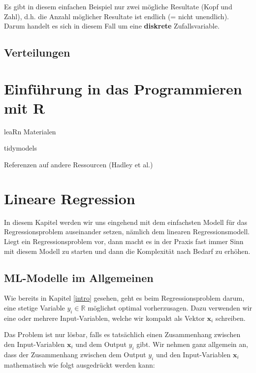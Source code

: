 \documentclass[
]{book}
\begin{document}
Es gibt in diesem einfachen Beispiel nur zwei mögliche Resultate (Kopf und Zahl), d.h. die Anzahl möglicher Resultate ist endlich (= nicht unendlich). Darum handelt es sich in diesem Fall um eine \textbf{diskrete} Zufallsvariable.

\hypertarget{verteilungen}{%
\section{Verteilungen}\label{verteilungen}}

\hypertarget{intro-R}{%
\chapter{Einführung in das Programmieren mit R}\label{intro-R}}

leaRn Materialen

tidymodels

Referenzen auf andere Ressourcen (Hadley et al.)

\hypertarget{lin-reg}{%
\chapter{Lineare Regression}\label{lin-reg}}

In diesem Kapitel werden wir uns eingehend mit dem einfachsten Modell für das Regressionsproblem auseinander setzen, nämlich dem linearen Regressionsmodell. Liegt ein Regressionsproblem vor, dann macht es in der Praxis fast immer Sinn mit diesem Modell zu starten und dann die Komplexität nach Bedarf zu erhöhen.

\hypertarget{ml-modelle-im-allgemeinen}{%
\section{ML-Modelle im Allgemeinen}\label{ml-modelle-im-allgemeinen}}

Wie bereits in Kapitel \ref{intro} gesehen, geht es beim Regressionsproblem darum, eine stetige Variable \(y_i \in \mathbb{R}\) möglichst optimal vorherzusagen. Dazu verwenden wir eine oder mehrere Input-Variablen, welche wir kompakt als Vektor \(\mathbf{x}_i\) schreiben.

Das Problem ist nur lösbar, falls es tatsächlich einen Zusammenhang zwischen den Input-Variablen \(\mathbf{x}_i\) und dem Output \(y_i\) gibt. Wir nehmen ganz allgemein an, dass der Zusammenhang zwischen dem Output \(y_i\) und den Input-Variablen \(\mathbf{x}_i\) mathematisch wie folgt ausgedrückt werden kann:
\end{document}
